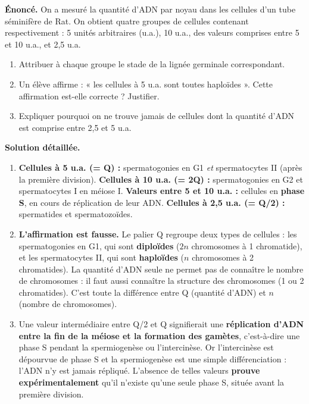 \documentclass[11pt]{article}
\begin{document}
\begin{exoresolu}
\textbf{Énoncé.} On a mesuré la quantité d'ADN par noyau dans les cellules d'un tube séminifère de Rat. On obtient quatre groupes de cellules contenant respectivement : 5 unités arbitraires (u.a.), 10 u.a., des valeurs comprises entre 5 et 10 u.a., et 2,5 u.a.
\begin{enumerate}
\item Attribuer à chaque groupe le stade de la lignée germinale correspondant.
\item Un élève affirme : « les cellules à 5 u.a. sont toutes haploïdes ». Cette affirmation est-elle correcte ? Justifier.
\item Expliquer pourquoi on ne trouve jamais de cellules dont la quantité d'ADN est comprise entre 2,5 et 5 u.a.
\end{enumerate}
\tcblower
\textbf{Solution détaillée.}
\begin{enumerate}
\item \textbf{Cellules à 5 u.a. (= Q) :} spermatogonies en G1 \emph{et} spermatocytes II (après la première division). \textbf{Cellules à 10 u.a. (= 2Q) :} spermatogonies en G2 et spermatocytes I en méiose I. \textbf{Valeurs entre 5 et 10 u.a. :} cellules en \textbf{phase S}, en cours de réplication de leur ADN. \textbf{Cellules à 2,5 u.a. (= Q/2) :} spermatides et spermatozoïdes.
\item \textbf{L'affirmation est fausse.} Le palier Q regroupe deux types de cellules : les spermatogonies en G1, qui sont \textbf{diploïdes} ($2n$ chromosomes à 1 chromatide), et les spermatocytes II, qui sont \textbf{haploïdes} ($n$ chromosomes à 2 chromatides). La quantité d'ADN seule ne permet pas de connaître le nombre de chromosomes : il faut aussi connaître la structure des chromosomes (1 ou 2 chromatides). C'est toute la différence entre Q (quantité d'ADN) et $n$ (nombre de chromosomes).
\item Une valeur intermédiaire entre Q/2 et Q signifierait une \textbf{réplication d'ADN entre la fin de la méiose et la formation des gamètes}, c'est-à-dire une phase S pendant la spermiogenèse ou l'intercinèse. Or l'intercinèse est dépourvue de phase S et la spermiogenèse est une simple différenciation : l'ADN n'y est jamais répliqué. L'absence de telles valeurs \textbf{prouve expérimentalement} qu'il n'existe qu'une seule phase S, située avant la première division.
\end{enumerate}
\end{exoresolu}
\end{document}

